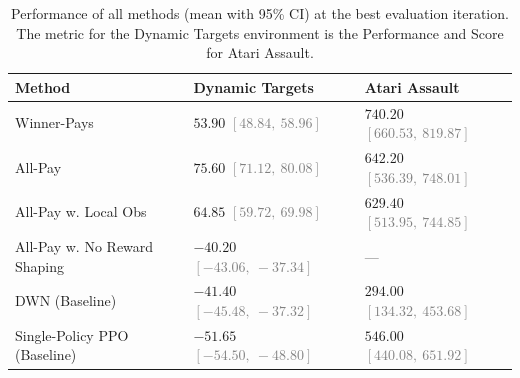 \begin{table}
  \centering
  \caption{Performance of all methods (mean with 95\% CI) at the best evaluation iteration. The metric for the Dynamic Targets environment is the Performance and Score for Atari Assault.}
  \begin{tabular}{lll}
    \hline
    {\bf Method} & {\bf Dynamic Targets} & {\bf Atari Assault} \\
    \hline
    Winner-Pays & $53.90$ {\small\textcolor{gray}{$[48.84,\ 58.96]$}} & $740.20$ {\small\textcolor{gray}{$[660.53,\ 819.87]$}} \\
    All-Pay & $75.60$ {\small\textcolor{gray}{$[71.12,\ 80.08]$}} & $642.20$ {\small\textcolor{gray}{$[536.39,\ 748.01]$}} \\
    All-Pay w. Local Obs & $64.85$ {\small\textcolor{gray}{$[59.72,\ 69.98]$}} & $629.40$ {\small\textcolor{gray}{$[513.95,\ 744.85]$}} \\
    All-Pay w. No Reward Shaping & $-40.20$ {\small\textcolor{gray}{$[-43.06,\ -37.34]$}} & --- \\
    DWN (Baseline) & $-41.40$ {\small\textcolor{gray}{$[-45.48,\ -37.32]$}} & $294.00$ {\small\textcolor{gray}{$[134.32,\ 453.68]$}} \\
    Single-Policy PPO (Baseline) & $-51.65$ {\small\textcolor{gray}{$[-54.50,\ -48.80]$}} & $546.00$ {\small\textcolor{gray}{$[440.08,\ 651.92]$}} \\
    \hline
  \end{tabular}
  \label{tab:all_methods_comp}
\end{table}
